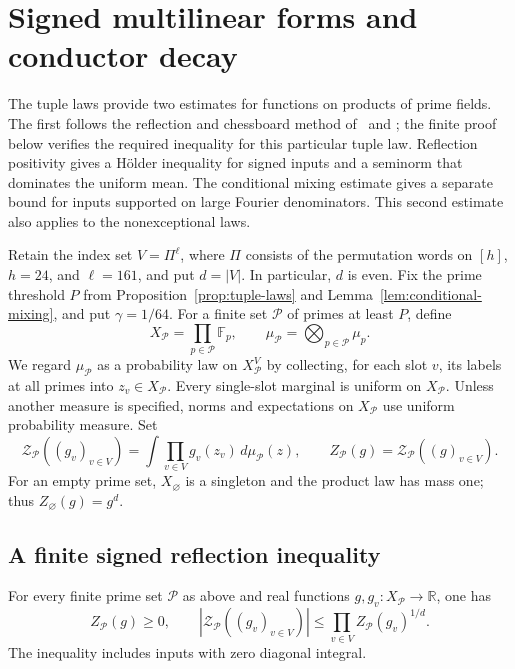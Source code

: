 \section{Signed multilinear forms and conductor decay}
\label{sec:functional}

The tuple laws provide two estimates for functions on products of prime
fields. The first follows the reflection and chessboard method
of~\cite[Theorem~2.2]{FrohlichLieb1978} and
\cite[Theorem~4.1]{FILS1978ReflectionI}; the finite proof below verifies
the required inequality for this particular tuple law.  Reflection positivity gives a H\"older inequality for signed
inputs and a seminorm that dominates the uniform mean.  The conditional
mixing estimate gives a separate bound for inputs supported on large
Fourier denominators.  This second estimate also applies to the
nonexceptional laws.

Retain the index set \(V=\Pi^\ell\), where \(\Pi\) consists of the
permutation words on \([h]\), \(h=24\), and \(\ell=161\), and put
\(d=|V|\).  In particular, \(d\) is even.  Fix the prime threshold
\(P\) from Proposition~\ref{prop:tuple-laws} and
Lemma~\ref{lem:conditional-mixing}, and put \(\gamma=1/64\).
For a finite set \(\mathcal P\) of primes at least \(P\), define
\[
 X_{\mathcal P}=\prod_{p\in\mathcal P}\mathbb F_p,
 \qquad
 \mu_{\mathcal P}=\bigotimes_{p\in\mathcal P}\mu_p.
\]
We regard \(\mu_{\mathcal P}\) as a probability law on
\(X_{\mathcal P}^V\) by collecting, for each slot \(v\), its labels
at all primes into \(z_v\in X_{\mathcal P}\).  Every single-slot
marginal is uniform on \(X_{\mathcal P}\).  Unless another measure
is specified, norms and expectations on \(X_{\mathcal P}\) use
uniform probability measure.  Set
\begin{equation}
 \mathcal Z_{\mathcal P}((g_v)_{v\in V})
   =\int\prod_{v\in V}g_v(z_v)\,d\mu_{\mathcal P}(z),
 \qquad
 Z_{\mathcal P}(g)=\mathcal Z_{\mathcal P}((g)_{v\in V}).
 \label{eq:functional-definition}
\end{equation}
For an empty prime set, \(X_{\varnothing}\) is a singleton and
the product law has mass one; thus \(Z_{\varnothing}(g)=g^d\).

\subsection{A finite signed reflection inequality}

\begin{proposition}
\label{prop:signed-holder}
For every finite prime set \(\mathcal P\) as above and real functions
\(g,g_v:X_{\mathcal P}\to\mathbb R\), one has
\begin{equation}
 Z_{\mathcal P}(g)\ge0,
 \qquad
 \left|\mathcal Z_{\mathcal P}((g_v)_{v\in V})\right|
 \le\prod_{v\in V}Z_{\mathcal P}(g_v)^{1/d}.
 \label{eq:signed-holder}
\end{equation}
The inequality includes inputs with zero diagonal integral.
\end{proposition}

